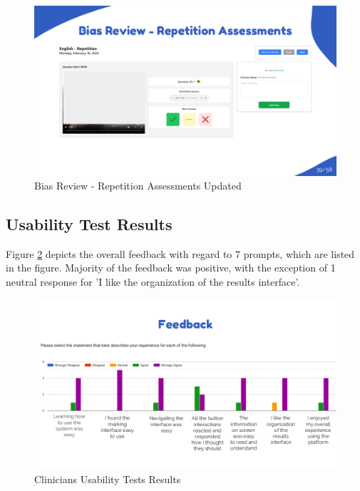 \documentclass{article}
\begin{document}
\begin{figure}[H]
  \centering
  \includegraphics[width=\textwidth]{images/slide39.png}
  \caption{Bias Review - Repetition Assessments Updated}
  \label{fig:rep_new}
\end{figure}

\newpage

\subsection{Usability Test Results}

\hspace{2em} Figure \ref{fig:clinicians_usability} depicts the overall feedback with regard to 7 prompts, which are listed in the figure.
Majority of the feedback was positive, with the exception of 1 neutral response for 'I like the organization of the results interface'.

\begin{figure}[H]
  \centering
  \includegraphics[width=\textwidth]{images/slide41.png}
  \caption{Clinicians Usability Tests Results}
  \label{fig:clinicians_usability}
\end{figure}
\end{document}

